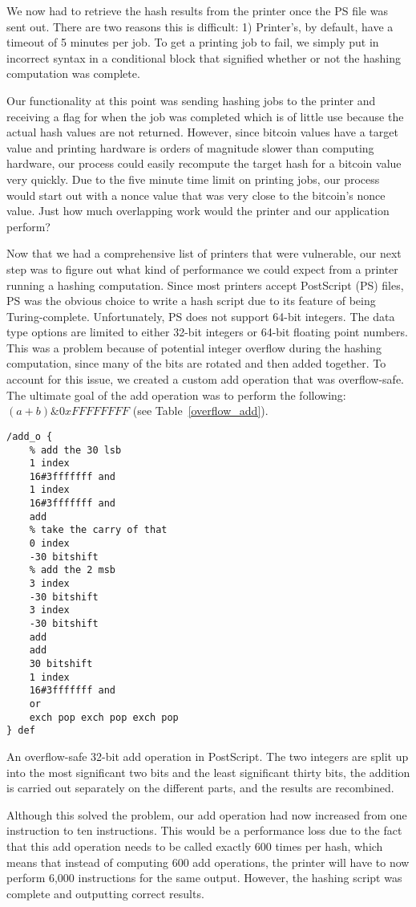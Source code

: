 We now had to retrieve the hash results from the printer once the PS file was sent out.
There are two reasons this is difficult: 1) Printer’s, by default, have a timeout of 5 minutes per job.
To get a printing job to fail, we simply put in incorrect syntax in a conditional block that signified whether or not the hashing computation was complete.

Our functionality at this point was sending hashing jobs to the printer and receiving a flag for when the job was completed which is of little use because the actual hash values are not returned.
However, since bitcoin values have a target value and printing hardware is orders of magnitude slower than computing hardware, our process could easily recompute the target hash for a bitcoin value very quickly.
Due to the five minute time limit on printing jobs, our process would start out with a nonce value that was very close to the bitcoin’s nonce value.
Just how much overlapping work would the printer and our application perform?

Now that we had a comprehensive list of printers that were vulnerable, our next step was to figure out what kind of performance we could expect from a printer running a hashing computation.
Since most printers accept PostScript (PS) files, PS was the obvious choice to write a hash script due to its feature of being Turing-complete.
Unfortunately, PS does not support 64-bit integers.
The data type options are limited to either 32-bit integers or 64-bit floating point numbers.
This was a problem because of potential integer overflow during the hashing computation, since many of the bits are rotated and then added together.
To account for this issue, we created a custom add operation that was overflow-safe.
The ultimate goal of the add operation was to perform the following: $(a + b) \& 0xFFFFFFFF$ (see Table~\ref{overflow_add}).

\begin{table}
\label{overflow_add}
\begin{verbatim}
/add_o {
	% add the 30 lsb
	1 index
	16#3fffffff and
	1 index
	16#3fffffff and
	add
	% take the carry of that
	0 index
	-30 bitshift
	% add the 2 msb
	3 index
	-30 bitshift
	3 index
	-30 bitshift
	add
	add
	30 bitshift
	1 index
	16#3fffffff and
	or
	exch pop exch pop exch pop
} def
\end{verbatim}
\caption{An overflow-safe 32-bit add operation in PostScript. The two integers are split up into the most significant two bits and the least significant thirty bits, the addition is carried out separately on the different parts, and the results are recombined.}
\end{table}

Although this solved the problem, our add operation had now increased from one instruction to ten instructions.
This would be a performance loss due to the fact that this add operation needs to be called exactly 600 times per hash, which means that instead of computing 600 add operations, the printer will have to now perform 6,000 instructions for the same output.
However, the hashing script was complete and outputting correct results.

